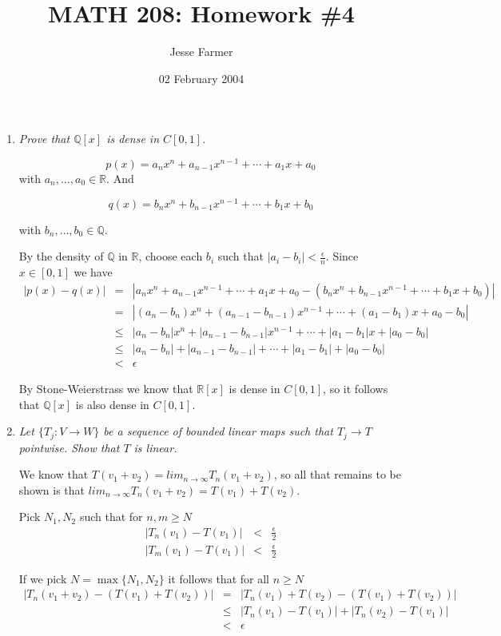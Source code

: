 \documentclass[11pt]{article}
\title{MATH 208: Homework \#4}
\author{Jesse Farmer}
\date{02 February 2004}
\begin{document}
\maketitle
\begin{enumerate}

\item \emph{Prove that $\mathbb{Q}[x]$ is dense in $C[0,1]$.}

\[
p(x) = a_nx^n + a_{n-1}x^{n-1} + \cdots + a_1x + a_0
\]
with $a_n,\ldots,a_0 \in \mathbb{R}$.  And

\[
q(x) = b_nx^n + b_{n-1}x^{n-1} + \cdots + b_1x + b_0
\]

with $b_n,\ldots,b_0 \in \mathbb{Q}$.

By the density of $\mathbb{Q}$ in $\mathbb{R}$, choose each $b_i$ such that $|a_i - b_i| < \frac{\epsilon}{n}$.  Since $x \in [0,1]$ we have
\begin{eqnarray*}
|p(x) - q(x)| &=& |a_nx^n + a_{n-1}x^{n-1} + \cdots + a_1x + a_0 - (b_nx^n + b_{n-1}x^{n-1} + \cdots + b_1x + b_0)| \\
&=& |(a_n-b_n)x^n + (a_{n-1}-b_{n-1})x^{n-1} + \cdots + (a_1-b_1)x + a_0-b_0| \\
&\leq& |a_n-b_n|x^n + |a_{n-1}-b_{n-1}|x^{n-1} + \cdots + |a_1-b_1|x + |a_0-b_0| \\
&\leq& |a_n-b_n| + |a_{n-1}-b_{n-1}| + \cdots + |a_1-b_1| + |a_0-b_0| \\
&<& \epsilon
\end{eqnarray*}

By Stone-Weierstrass we know that $\mathbb{R}[x]$ is dense in $C[0,1]$, so it follows that $\mathbb{Q}[x]$ is also dense in $C[0,1]$.

\item \emph{Let $\{T_j: V \rightarrow W\}$ be a sequence of bounded linear maps such that $T_j \rightarrow T$ pointwise.  Show that $T$ is linear.}

We know that $T(v_1+v_2) = lim_{n \rightarrow \infty}T_n(v_1+v_2)$, so all that remains to be shown is that $lim_{n \rightarrow \infty}T_n(v_1+v_2) = T(v_1) + T(v_2)$.

Pick $N_1,N_2$ such that for $n,m \geq N$
\begin{eqnarray*}
|T_n(v_1) - T(v_1)| &<& \frac{\epsilon}{2} \\
|T_m(v_1) - T(v_1)| &<& \frac{\epsilon}{2}
\end{eqnarray*}

If we pick $N = \max\{N_1,N_2\}$ it follows that for all $n \geq N$
\begin{eqnarray*}
|T_n(v_1 + v_2) - (T(v_1) + T(v_2))| &=& |T_n(v_1) + T(v_2) - (T(v_1) + T(v_2))| \\
&\leq& |T_n(v_1) - T(v_1)| + |T_n(v_2) - T(v_1)| \\
&<& \epsilon
\end{eqnarray*}


\end{enumerate}
\end{document}
